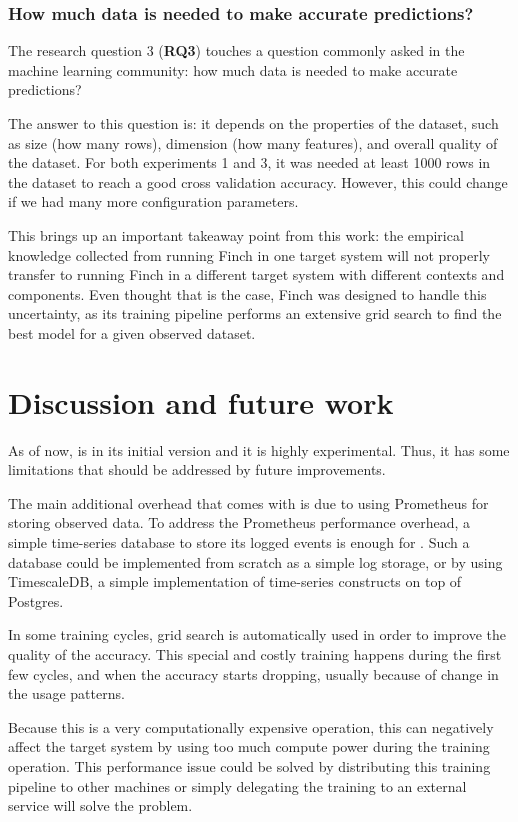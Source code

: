 \subsubsection{How much data is needed to make accurate predictions?}

The research question 3 (\textbf{RQ3}) touches a question commonly asked in the machine learning community: how much data is needed to make accurate predictions?

The answer to this question is: it depends on the properties of the dataset, such as size (how many rows), dimension (how many features), and overall quality of the dataset. For both experiments 1 and 3, it was needed at least 1000 rows in the dataset to reach a good cross validation accuracy. However, this could change if we had many more configuration parameters.

This brings up an important takeaway point from this work: the empirical knowledge collected from running Finch in one target system will not properly transfer to running Finch in a different target system with different contexts and components. Even thought that is the case, Finch was designed to handle this uncertainty, as its training pipeline performs an extensive grid search to find the best model for a given observed dataset.


\section{Discussion and future work}

As of now, \projectname{} is in its initial version and it is highly experimental. Thus, it has some limitations that should be addressed by future improvements.

The main additional overhead that comes with \projectname{} is due to using Prometheus for storing observed data. To address the Prometheus performance overhead, a simple time-series database to store its logged events is enough for \projectname{}. Such a database could be implemented from scratch as a simple log storage, or by using TimescaleDB, a simple implementation of time-series constructs on top of Postgres.

In some training cycles, grid search is automatically used in order to improve the quality of the accuracy. This special and costly training happens during the first few cycles, and when the accuracy starts dropping, usually because of change in the usage patterns.

Because this is a very computationally expensive operation, this can negatively affect the target system by using too much compute power during the training operation. This performance issue could be solved by distributing this training pipeline to other machines or simply delegating the training to an external service will solve the problem.

